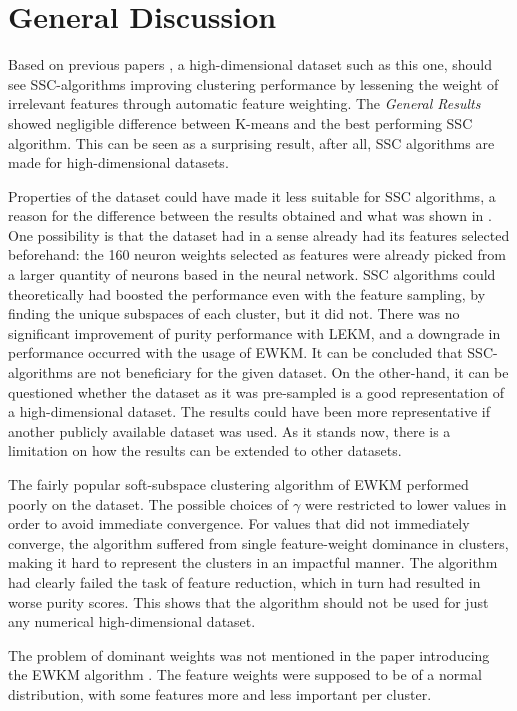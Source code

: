 \documentclass[../report.tex]{subfiles}
\begin{document}
\section{General Discussion}
Based on previous papers \cite{Jing2007, Gan2006}, a high-dimensional dataset such as this one, should see SSC-algorithms improving clustering performance by lessening the weight of irrelevant features through automatic feature weighting. The \textit{General Results} showed negligible difference between K-means and the best performing SSC algorithm. This can be seen as a surprising result, after all, SSC algorithms are made for high-dimensional datasets.

Properties of the dataset could have made it less suitable for SSC algorithms, a reason for the difference between the results obtained and what was shown in \cite{Jing2007}. One possibility is that the dataset had in a sense already had its features selected beforehand: the 160 neuron weights selected as features were already picked from a larger quantity of neurons based in the neural network. SSC algorithms could theoretically had boosted the performance even with the feature sampling, by finding the unique subspaces of each cluster, but it did not. There was no significant improvement of purity performance with LEKM, and a downgrade in performance occurred with the usage of EWKM. It can be concluded that SSC-algorithms are not beneficiary for the given dataset. On the other-hand, it can be questioned whether the dataset as it was pre-sampled is a good representation of a high-dimensional dataset. The results could have been more representative if another publicly available dataset was used. As it stands now, there is a limitation on how the results can be extended to other datasets.

The fairly popular soft-subspace clustering algorithm of EWKM performed poorly on the dataset. The possible choices of $\gamma$ were restricted to lower values in order to avoid immediate convergence. For values that did not immediately converge, the algorithm suffered from single feature-weight dominance in clusters, making it hard to represent the clusters in an impactful manner. The algorithm had clearly failed the task of feature reduction, which in turn had resulted in worse purity scores. This shows that the algorithm should not be used for just any numerical high-dimensional dataset.

The problem of dominant weights was not mentioned in the paper introducing the EWKM algorithm \cite{Jing2007}.  The feature weights were supposed to be of a normal distribution, with some features more and less important per cluster.
\end{document}
